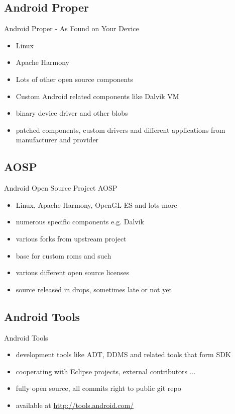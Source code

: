 \documentclass[aspectratio=169]{beamer}
\newcommand{\surl}[1] {{\tiny \url{#1}}}
\begin{document}
  \subsection{Android Proper}
    \begin{frame}{Android Proper - As Found on Your Device}
      \begin{itemize}
        \item<1->Linux
        \item<2->Apache Harmony 
        \item<3->Lots of other open source components
        \item<4->Custom Android related components like Dalvik VM
        \item<5->binary device driver and other blobs 
        \item<6->patched components, custom drivers and different applications from manufacturer and provider
      \end{itemize}
    \end{frame}
  
  \subsection{AOSP}
    \begin{frame}{Android Open Source Project AOSP}
      \begin{itemize}
        \item<1->Linux, Apache Harmony, OpenGL ES and lots more
        \item<2->numerous specific components e.g. Dalvik
        \item<3->various forks from upstream project
        \item<4->base for custom roms and such
        \item<5->various different open source licenses
        \item<6->source released in drops, sometimes late or not yet
      \end{itemize}
    \end{frame}

  \subsection{Android Tools}
    \begin{frame}{Android Tools}
      \begin{itemize}
        \item<1->development tools like ADT, DDMS and related tools that form SDK 
        \item<2->cooperating with Eclipse projects, external contributors ...
        \item<3->fully open source, all commits right to public git repo
        \item<4->available at \surl{http://tools.android.com/}
      \end{itemize}
    \end{frame}
\end{document}
